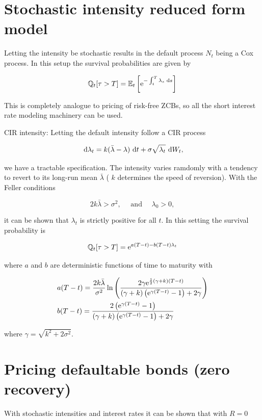 \section{Stochastic intensity reduced form model}
Letting the intensity be stochastic results in the default process $N_{t}$ being a Cox process. In this setup the survival probabilities are given by

$$
\mathbb{Q}_{t}[\tau>T]=\mathbb{E}_{t}\left[\mathrm{e}^{-\int_{t}^{T} \lambda_{s} \text{ d}  s}\right]
$$

This is completely analogue to pricing of risk-free ZCBs, so all the short interest rate modeling machinery can be used.

CIR intensity: Letting the default intensity follow a CIR process

$$
\text{ d}  \lambda_{t}=k(\bar{\lambda}-\lambda) \text{ d}  t+\sigma \sqrt{\lambda_{t}} \text{ d}  W_{t},
$$

we have a tractable specification. The intensity varies ramdomly with a tendency to revert to its long-run mean $\bar{\lambda}$ ( $k$ determines the speed of reversion). With the Feller conditions

$$
2 k \bar{\lambda}>\sigma^{2}, \quad \text { and } \quad \lambda_{0}>0,
$$

it can be shown that $\lambda_{t}$ is strictly positive for all $t$. In this setting the survival probability is

$$
\mathbb{Q}_{t}[\tau>T]=\mathrm{e}^{a(T-t)-b(T-t) \lambda_{t}}
$$

where $a$ and $b$ are deterministic functions of time to maturity with

$$
\begin{aligned}
& a(T-t)=\frac{2 k \bar{\lambda}}{\sigma^{2}} \ln \left(\frac{2 \gamma \mathrm{e}^{\frac{1}{2}(\gamma+k)(T-t)}}{(\gamma+k)\left(\mathrm{e}^{\gamma(T-t)}-1\right)+2 \gamma}\right) \\
& b(T-t)=\frac{2\left(\mathrm{e}^{\gamma(T-t)}-1\right)}{(\gamma+k)\left(\mathrm{e}^{\gamma(T-t)}-1\right)+2 \gamma}
\end{aligned}
$$

where $\gamma=\sqrt{k^{2}+2 \sigma^{2}}$.

\section{Pricing defaultable bonds (zero recovery)}
With stochastic intensities and interest rates it can be shown that with $R=0$

